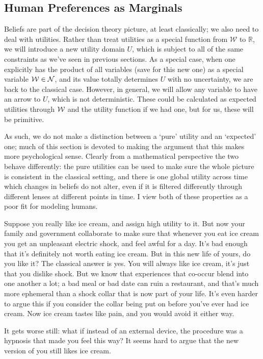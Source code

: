 \documentclass{article}
\begin{document}
	\subsection{Human Preferences as Marginals}	\label{sec:human-pref-marginals}
	Beliefs are part of the decision theory picture, at least classically; we also need to deal with utilities. Rather than treat utilities as a special function from $\mathcal W$ to $\mathbb R$, we will introduce a new utility domain $U$, which is subject to all of the same constraints as we've seen in previous sections. As a special case, when one explicitly has the product of all variables (save for this new one) as a special variable $\cal W \in N$, and its value totally determines $U$ with no uncertainty, we are back to the classical case. However, in general, we will allow any variable to have an arrow to $U$, which is not deterministic. These could be calculated as expected utilities through $\cal W$ and the utility function if we had one, but for us, these will be primitive. 
	
	As such, we do not make a distinction between a `pure' utility and an `expected' one; much of this section is devoted to making the argument that this makes more psychological sense. Clearly from a mathematical perspective the two behave differently: the pure utilities can be used to make sure the whole picture is consistent in the classical setting, and there is one global utility across time which changes in beliefs do not alter, even if it is filtered differently through different lenses at different points in time. I view both of these properties as a poor fit for modeling humans.
	
	\begin{example}
		Suppose you really like ice cream, and assign high utility to it. But now your family and government collaborate to make sure that whenever you eat ice cream you get an unpleasant electric shock, and feel awful for a day. It's bad enough that it's definitely not worth eating ice cream. But in this new life of yours, do you like it? The classical answer is yes. You will always like ice cream, it's just that you dislike shock. But we know that experiences that co-occur blend into one another a lot; a bad meal or bad date can ruin a restaurant, and that's much more ephemeral than a shock collar that is now part of your life. It's even harder to argue this if you consider the collar being put on before you've ever had ice cream. Now ice cream tastes like pain, and you would avoid it either way.		
		
		It gets worse still: what if instead of an external device, the procedure was a hypnosis that made you feel this way? It seems hard to argue that the new version of you still likes ice cream.
	\end{example}
\end{document}
